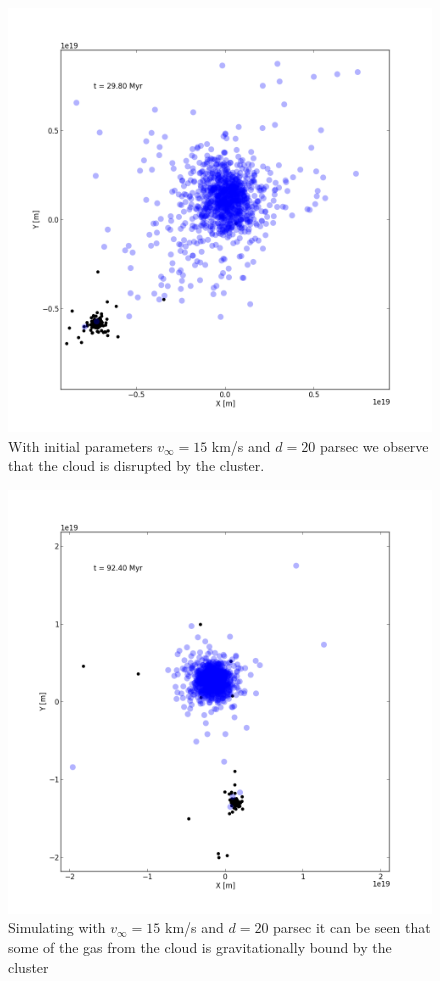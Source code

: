 \documentclass{aa}
\begin{document}
\begin{figure}
    \centering
    \includegraphics[width=\hsize]{img/v_15_d_20.png}
    \caption{With initial parameters $v_\infty = 15$ km/s and $d = 20$ parsec we observe that the cloud is disrupted by the cluster.}\label{fig:v_15_d_20}
\end{figure}
\begin{figure}
    \centering
    \includegraphics[width=\hsize]{img/v_75_d_80.png}
    \caption{Simulating with $v_\infty = 15$ km/s and $d = 20$ parsec it can be seen that some of the gas from the cloud is gravitationally bound by the cluster}\label{fig:v_75_d_80}
\end{figure}
\end{document}

